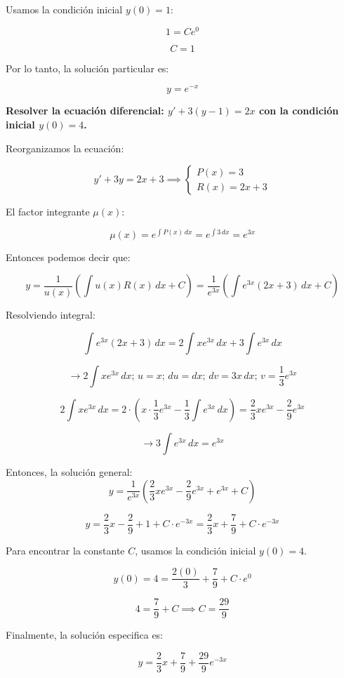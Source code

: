 \documentclass[answers]{exam}
\begin{document}
\begin{questions}
	Usamos la condición inicial \( y(0) = 1 \):

	\[
		1 = C e^0
	\]

	\[
		C = 1
	\]

	Por lo tanto, la solución particular es:

	\[
		y = e^{-x}
	\]



	\question \textbf{Resolver la ecuación diferencial:
		$
			y' + 3(y - 1) = 2x
		$
		con la condición inicial \( y(0) = 4 \).}

	Reorganizamos la ecuación:

	\[
		y' + 3y = 2x + 3 \implies  \left\{
		\begin{array}{lcc}
			P(x) = 3 \\
			R(x) = 2x+3
		\end{array} \right.
	\]

	El factor integrante \( \mu(x) \):

	\[
		\mu(x) = e^{\int P(x) \, dx} = e^{\int 3 \, dx} = e^{3x}
	\]

	Entonces podemos decir que:

	\[
		y = \frac{1}{u(x)} \left(\int{u(x) R(x)  \, dx} + C\right) = \frac{1}{e^{3x}} \left(\int{e^{3x} (2x + 3)  \, dx} + C \right)
	\]
	\newpage

	Resolviendo integral:

	\[
		\int{e^{3x} (2x + 3)  \, dx} = 2\int{xe^{3x} \, dx}+3\int{e^{3x} \, dx}
	\]

	\[
		\rightarrow 2\int{xe^{3x} \, dx} ;\, u = x;\, du = dx ;\, dv = 3x \, dx ;\, v = \frac{1}{3}e^{3x}
	\]

	\[
		2\int{xe^{3x} \, dx} = 2\cdot \left(x\cdot \frac{1}{3}e^{3x}-\frac{1}{3}\int{e^{3x} \, dx}\right) = \frac{2}{3}xe^{3x}-\frac{2}{9}e^{3x}
	\]

	\[
		\rightarrow 3\int{e^{3x} \, dx} = e^{3x}
	\]

	Entonces, la solución general:
	\[
		y = \frac{1}{e^{3x}} \left(\frac{2}{3}xe^{3x}-\frac{2}{9}e^{3x} + e^{3x} + C \right)
	\]

	\[
		y = \frac{2}{3}x-\frac{2}{9} + 1 + C\cdot e^{-3x}  = \frac{2}{3}x+\frac{7}{9} + C\cdot e^{-3x}
	\]

	Para encontrar la constante \(C\), usamos la condición inicial \(y(0) = 4\).

	\[
		y (0) = 4 = \frac{2(0)}{3} + \frac{7}{9} + C\cdot e^{0}
	\]

	\[
		4 = \frac{7}{9} + C \implies C = \frac{29}{9}
	\]


	Finalmente, la solución especifica es:

	\[
		y = \frac{2}{3}x + \frac{7}{9} + \frac{29}{9} e^{-3x}
	\]


\end{questions}
\end{document}
